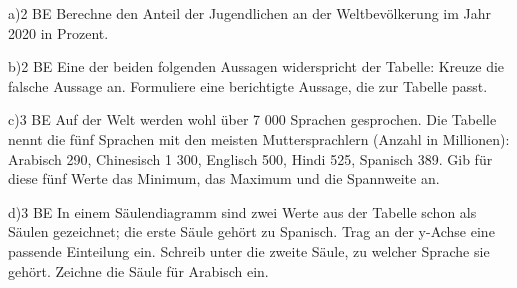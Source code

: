 \documentclass[11pt]{article}
\begin{document}
\begin{pfaufg}{}{a)}{2 BE}
Berechne den Anteil der Jugendlichen an der Weltbevölkerung im Jahr 2020 in Prozent.
\end{pfaufg}
\begin{pfaufg}{}{b)}{2 BE}
Eine der beiden folgenden Aussagen widerspricht der Tabelle: Kreuze die falsche Aussage an. Formuliere eine berichtigte Aussage, die zur Tabelle passt.
\end{pfaufg}
\begin{pfaufg}{}{c)}{3 BE}
Auf der Welt werden wohl über 7 000 Sprachen gesprochen. Die Tabelle nennt die fünf Sprachen mit den meisten Muttersprachlern (Anzahl in Millionen): Arabisch 290, Chinesisch 1 300, Englisch 500, Hindi 525, Spanisch 389. Gib für diese fünf Werte das Minimum, das Maximum und die Spannweite an.
\par\smallskip\noindent {}\par
{}
\end{pfaufg}
\begin{pfaufg}{}{d)}{3 BE}
In einem Säulendiagramm sind zwei Werte aus der Tabelle schon als Säulen gezeichnet; die erste Säule gehört zu Spanisch. Trag an der y-Achse eine passende Einteilung ein. Schreib unter die zweite Säule, zu welcher Sprache sie gehört. Zeichne die Säule für Arabisch ein.
\par\smallskip\noindent {}\par
{}
\end{pfaufg}
\end{document}
